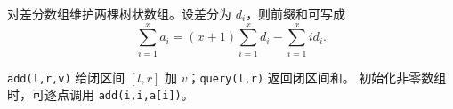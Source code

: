 对差分数组维护两棵树状数组。设差分为 $d_i$，则前缀和可写成
\[
  \sum_{i=1}^{x}a_i=(x+1)\sum_{i=1}^{x}d_i-\sum_{i=1}^{x}i d_i.
\]

\texttt{add(l,r,v)} 给闭区间 $[l,r]$ 加 $v$；\texttt{query(l,r)} 返回闭区间和。
初始化非零数组时，可逐点调用 \texttt{add(i,i,a[i])}。
